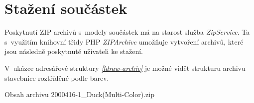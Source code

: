 \section{Stažení součástek}
Poskytnutí ZIP archivů s~modely součástek má na starost služba \textit{ZipService}. Ta s~využitím knihovní třidy PHP \textit{ZIPArchive} umožňuje vytvoření archivů, které jsou následně poskytnuté uživateli ke stažení. 

V~ukázce adresářové struktury \emph{\ref{ldraw-archiv}} je možné vidět strukturu archivu stavebnice roztříděné podle barev.

\begin{dirfigure}%
    \caption{Obsah archivu 2000416-1\_Duck(Multi-Color).zip}\label{ldraw-archiv}
\end{dirfigure}